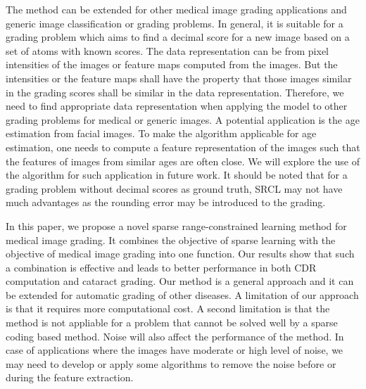 \documentclass[journal]{IEEEtran}
\begin{document}
The method can be extended for other medical image grading
applications and generic image classification or grading
problems. In general, it is suitable for a grading problem which
aims to find a decimal score for a new image based on a set
of atoms with known scores. The data representation can be
from pixel intensities of the images or feature maps computed
from the images. But the intensities or the feature maps shall
have the property that those images similar in the grading
scores shall be similar in the data representation. Therefore,
we need to find appropriate data representation when applying
the model to other grading problems for medical or generic
images. A potential application is the age estimation from
facial images. To make the algorithm applicable for age
estimation, one needs to compute a feature representation of
the images such that the features of images from similar ages
are often close. We will explore the use of the algorithm for
such application in future work. It should be noted that for
a grading problem without decimal scores as ground truth,
SRCL may not have much advantages as the rounding error
may be introduced to the grading.

In this paper, we propose a novel sparse range-constrained
learning method for medical image grading. It combines the
objective of sparse learning with the objective of medical
image grading into one function. Our results show that such
a combination is effective and leads to better performance
in both CDR computation and cataract grading. Our method
is a general approach and it can be extended for automatic
grading of other diseases. A limitation of our approach is that
it requires more computational cost. A second limitation is
that the method is not appliable for a problem that cannot be
solved well by a sparse coding based method. Noise will also
affect the performance of the method. In case of applications
where the images have moderate or high level of noise, we
may need to develop or apply some algorithms to remove the
noise before or during the feature extraction.





\end{document}
